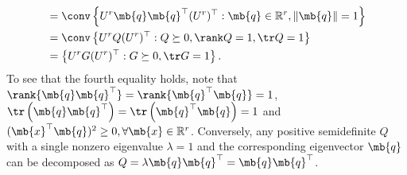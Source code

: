 \begin{exercise}
\begin{enumerate}
\begin{solution}
\begin{enumerate}
\begin{align*}
                            & = \conv\left\{U^r \mb{q} \mb{q}^\top (U^r)^\top : \mb{q} \in \mathbb{R}^r, \|\mb{q}\| = 1\right\} \\ 
                            & = \conv\left\{U^r Q (U^r)^\top : Q \succeq 0, \rank Q = 1, \tr Q = 1\right\}                      \\
                            & = \left\{U^r G (U^r)^\top : G \succeq 0, \tr G = 1\right\}.
            \end{align*}
            To see that the fourth equality holds, note that $\rank {\mb{q}\mb{q}^\top} = \rank {\mb{q}^\top\mb{q}} = 1$, $\tr \left({\mb{q}\mb{q}^\top}\right) = \tr \left({\mb{q}^\top\mb{q}}\right) = 1$ and $(\mb{x}^\top\mb{q})^2 \ge 0, \forall \mb{x} \in \mathbb{R}^r$. Conversely, any positive semidefinite $Q$ with a single nonzero eigenvalue $\lambda = 1$ and the corresponding eigenvector $\mb{q}$ can be decomposed as $Q = \lambda\mb{q}\mb{q}^\top = \mb{q}\mb{q}^\top$.
            

\end{enumerate}
\end{solution}
\end{enumerate}
\end{exercise}
